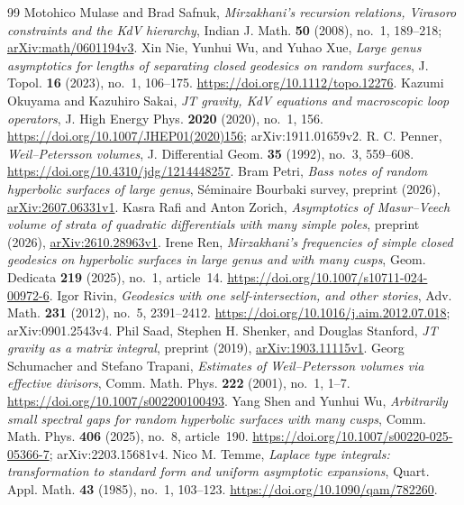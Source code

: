 \begin{thebibliography}{99}
 Motohico Mulase and Brad Safnuk, \emph{Mirzakhani's recursion relations, Virasoro constraints and the KdV hierarchy}, Indian J. Math. \textbf{50} (2008), no.~1, 189--218; \href{https://arxiv.org/abs/math/0601194v3}{arXiv:math/0601194v3}.
 Xin Nie, Yunhui Wu, and Yuhao Xue, \emph{Large genus asymptotics for lengths of separating closed geodesics on random surfaces}, J. Topol. \textbf{16} (2023), no.~1, 106--175. \url{https://doi.org/10.1112/topo.12276}.
 Kazumi Okuyama and Kazuhiro Sakai, \emph{JT gravity, KdV equations and macroscopic loop operators}, J. High Energy Phys. \textbf{2020} (2020), no.~1, 156. \url{https://doi.org/10.1007/JHEP01(2020)156}; arXiv:1911.01659v2.
 R. C. Penner, \emph{Weil--Petersson volumes}, J. Differential Geom. \textbf{35} (1992), no.~3, 559--608. \url{https://doi.org/10.4310/jdg/1214448257}.
 Bram Petri, \emph{Bass notes of random hyperbolic surfaces of large genus}, S\'eminaire Bourbaki survey, preprint (2026), \href{https://arxiv.org/abs/2607.06331v1}{arXiv:2607.06331v1}.
 Kasra Rafi and Anton Zorich, \emph{Asymptotics of Masur--Veech volume of strata of quadratic differentials with many simple poles}, preprint (2026), \href{https://arxiv.org/abs/2610.28963v1}{arXiv:2610.28963v1}.
 Irene Ren, \emph{Mirzakhani's frequencies of simple closed geodesics on hyperbolic surfaces in large genus and with many cusps}, Geom. Dedicata \textbf{219} (2025), no.~1, article~14. \url{https://doi.org/10.1007/s10711-024-00972-6}.
 Igor Rivin, \emph{Geodesics with one self-intersection, and other stories}, Adv. Math. \textbf{231} (2012), no.~5, 2391--2412. \url{https://doi.org/10.1016/j.aim.2012.07.018}; arXiv:0901.2543v4.
 Phil Saad, Stephen H. Shenker, and Douglas Stanford, \emph{JT gravity as a matrix integral}, preprint (2019), \href{https://arxiv.org/abs/1903.11115v1}{arXiv:1903.11115v1}.
 Georg Schumacher and Stefano Trapani, \emph{Estimates of Weil--Petersson volumes via effective divisors}, Comm. Math. Phys. \textbf{222} (2001), no.~1, 1--7. \url{https://doi.org/10.1007/s002200100493}.
 Yang Shen and Yunhui Wu, \emph{Arbitrarily small spectral gaps for random hyperbolic surfaces with many cusps}, Comm. Math. Phys. \textbf{406} (2025), no.~8, article~190. \url{https://doi.org/10.1007/s00220-025-05366-7}; arXiv:2203.15681v4.
 Nico M. Temme, \emph{Laplace type integrals: transformation to standard form and uniform asymptotic expansions}, Quart. Appl. Math. \textbf{43} (1985), no.~1, 103--123. \url{https://doi.org/10.1090/qam/782260}.

\end{thebibliography}

